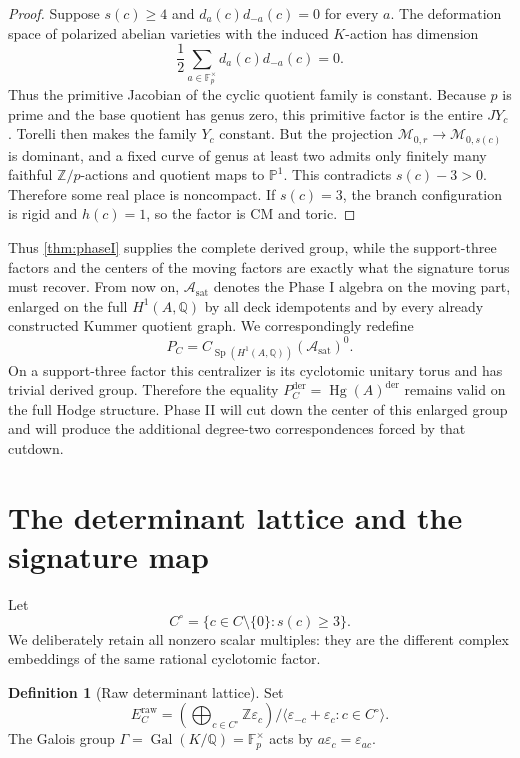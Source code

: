 \documentclass[11pt]{article}
\theoremstyle{definition}
\newtheorem{definition}[theorem]{Definition}
\theoremstyle{remark}
\newcommand{\Q}{\mathbb Q}
\newcommand{\Z}{\mathbb Z}
\newcommand{\F}{\mathbb F}
\newcommand{\PP}{\mathbb P}
\newcommand{\M}{\mathcal M}
\newcommand{\A}{\mathcal A}
\newcommand{\Hg}{\operatorname{Hg}}
\newcommand{\Gal}{\operatorname{Gal}}
\newcommand{\Sp}{\operatorname{Sp}}
\newcommand{\eps}{\varepsilon}
\newcommand{\raw}{\mathrm{raw}}
\newcommand{\sat}{\mathrm{sat}}
\newcommand{\der}{\mathrm{der}}
\begin{document}
\begin{proof}
Suppose $s(c)\ge4$ and $d_a(c)d_{-a}(c)=0$ for every $a$.  The deformation space of polarized abelian varieties with the induced $K$-action has dimension
\[
 \frac12\sum_{a\in\F_p^\times}d_a(c)d_{-a}(c)=0.
\]
Thus the primitive Jacobian of the cyclic quotient family is constant.  Because $p$ is prime and the base quotient has genus zero, this primitive factor is the entire $JY_c$.  Torelli then makes the family $Y_c$ constant.  But the projection $\M_{0,r}\to\M_{0,s(c)}$ is dominant, and a fixed curve of genus at least two admits only finitely many faithful $\Z/p$-actions and quotient maps to $\PP^1$.  This contradicts $s(c)-3>0$.  Therefore some real place is noncompact.  If $s(c)=3$, the branch configuration is rigid and $h(c)=1$, so the factor is CM and toric.
\end{proof}

Thus \cref{thm:phaseI} supplies the complete derived group, while the support-three factors and the centers of the moving factors are exactly what the signature torus must recover.  From now on, \(\A_{\sat}\) denotes the Phase I algebra on the moving part, enlarged on the full \(H^1(A,\Q)\) by all deck idempotents and by every already constructed Kummer quotient graph.  We correspondingly redefine
\[
 P_C=C_{\Sp(H^1(A,\Q))}(\A_{\sat})^0.
\]
On a support-three factor this centralizer is its cyclotomic unitary torus and has trivial derived group.  Therefore the equality \(P_C^{\der}=\Hg(A)^{\der}\) remains valid on the full Hodge structure.  Phase II will cut down the center of this enlarged group and will produce the additional degree-two correspondences forced by that cutdown.

\section{The determinant lattice and the signature map}\label{sec:lattice}

Let
\[
 C^\circ=\{c\in C\setminus\{0\}:s(c)\ge3\}.
\]
We deliberately retain all nonzero scalar multiples: they are the different complex embeddings of the same rational cyclotomic factor.

\begin{definition}[Raw determinant lattice]\label{def:raw-lattice}
Set
\begin{equation}\label{eq:Eraw}
 E_C^{\raw}=
 \left(\bigoplus_{c\in C^\circ}\Z\eps_c\right)
 \Big/\langle\eps_{-c}+\eps_c:c\in C^\circ\rangle.
\end{equation}
The Galois group $\Gamma=\Gal(K/\Q)=\F_p^\times$ acts by
$a\eps_c=\eps_{ac}$.
\end{definition}
\end{document}
